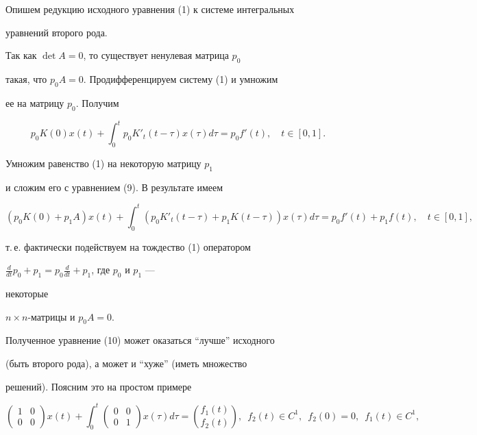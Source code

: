  


Опишем редукцию исходного уравнения (1) к системе интегральных 


уравнений второго рода. 


Так как $\det A=0$, то существует ненулевая матрица $p_0$ 


такая, что $p_0A=0$. Продифференцируем систему (1) и умножим 


ее на матрицу $p_0$. Получим 


\begin{equation} 


p_0K(0)x(t)+\int^t_0 p_0K'_t(t-\tau)x(\tau)d\tau= 


p_0f'(t),\quad t\in[0,1]. 


\end{equation} 


Умножим равенство (1) на некоторую матрицу $p_1$ 


и сложим его с уравнением (9). В результате имеем 


\begin{equation} 


(p_0K(0)+p_1A)x(t)+\int^t_0(p_0K'_t(t-\tau)+ 


p_1K(t-\tau))x(\tau)d\tau=p_0f'(t)+p_1f(t),\quad t\in[0,1], 


\end{equation} 


т.\,е.{} фактически подействуем на тождество (1) оператором 


$\frac{d}{dt}p_0+p_1=p_0\frac{d}{dt}+p_1$, где $p_0$ и $p_1$ --- 


некоторые 


$n\times n$-матрицы и $p_0A=0$. 


Полученное уравнение (10) может оказаться ``лучше'' исходного 


(быть второго рода), а может и ``хуже'' (иметь множество 


решений). Поясним это на простом примере 


\begin{equation} 


\begin{pmatrix} 1 & 0 \\ 0 & 0 \end{pmatrix} x(t)+ 


\int^t_0\begin{pmatrix} 0 & 0 \\ 0 & 1 \end{pmatrix} 


x(\tau)d\tau=\binom{f_1(t)}{f_2(t)},\ \; f_2(t)\in C^1, 


\ \; f_2(0)=0,\ \; f_1(t)\in C^1, 


\end{equation} 


